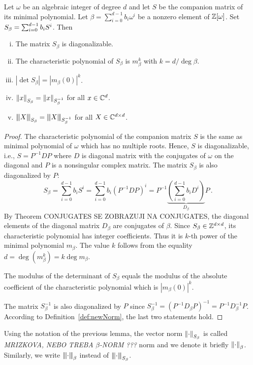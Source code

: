 \begin{lem}
Let $\omega$ be an algebraic integer of degree $d$ and let $S$ be the companion matrix of its minimal polynomial. Let $\beta=\sum_{i=0}^{d-1} b_i \omega^i$ be a nonzero element of $\mathbb{Z}[\omega]$. Set $S_\beta=\sum_{i=0}^{d-1} {b}_i S^i$. Then
\begin{enumerate}[i)]
   \item The matrix $S_\beta$ is diagonalizable.
   \item The characteristic polynomial of $S_\beta$ is $m_\beta^k$ with $k=d / \deg \beta$.
   \item $|\det S_\beta|=|m_\beta(0)|^k$.
   \item $\left\lVert x\right\rVert_{S_\beta}=\left\lVert x\right\rVert_{S_\beta^{-1}}$ for all $x \in \mathbb{C}^d$.
   \item ${\left\vert\kern-0.25ex\left\vert\kern-0.25ex\left\vert X\right\vert\kern-0.25ex\right\vert\kern-0.25ex\right\vert}_{S_\beta}={\left\vert\kern-0.25ex\left\vert\kern-0.25ex\left\vert X\right\vert\kern-0.25ex\right\vert\kern-0.25ex\right\vert}_{S_\beta^{-1}}$ for all $X \in \mathbb{C}^{d\times d}$.
\end{enumerate}  
\end{lem}
\begin{proof}
The characteristic polynomial of the companion matrix $S$ is the same as minimal polynomial of $\omega$ which has no multiple roots. Hence, $S$ is diagonalizable, i.e., $S=P^{-1}DP$ where $D$ is diagonal matrix with the conjugates of $\omega$ on the diagonal and $P$ is a nonsingular complex matrix. The matrix $S_\beta$ is also diagonalized by $P$:
$$
S_\beta=\sum_{i=0}^{d-1} b_i S^i= \sum_{i=0}^{d-1} b_i \left(P^{-1}DP\right)^i=P^{-1}\underbrace{\left(\sum_{i=0}^{d-1} b_i D^i\right)}_{D_\beta}P\,.
$$
By Theorem CONJUGATES SE ZOBRAZUJI NA CONJUGATES, the diagonal elements of the diagonal matrix $D_\beta$ are conjugates of $\beta$. Since $S_\beta\in\mathbb{Z}^{d\times d}$, its characteristic polynomial has integer coefficients. Thus it is $k$-th power of the minimal polynomial $m_\beta$. The value $k$ follows from the equality $d=\deg(m_\beta^k)=k \deg m_\beta$. 

The modulus of the determinant of $S_\beta$ equals the modulus of the absolute coefficient of the characteristic polynomial which is $|m_\beta(0)|^k$.

The matrix $S_\beta^{-1}$ is also diagonalized by $P$ since $S_\beta^{-1}=(P^{-1}D_\beta P)^{-1}=P^{-1}D_\beta^{-1}P$. According to Definition~\ref{def:newNorm}, the last two statements hold.
\end{proof}

\begin{defn}
Using the notation of the previous lemma, the vector norm $\left\lVert\cdot\right\rVert_{S_\beta}$ is called \emph{MRIZKOVA, NEBO TREBA $\beta$-NORM ???} norm and we denote it briefly $\left\lVert\cdot\right\rVert_{\beta}$. Similarly, we write ${\left\vert\kern-0.25ex\left\vert\kern-0.25ex\left\vert \cdot\right\vert\kern-0.25ex\right\vert\kern-0.25ex\right\vert}_{\beta}$  instead of ${\left\vert\kern-0.25ex\left\vert\kern-0.25ex\left\vert \cdot\right\vert\kern-0.25ex\right\vert\kern-0.25ex\right\vert}_{S_\beta}$.
\end{defn}

